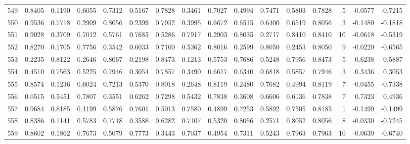 \begin{tabular}{lrrrrrrrrrrrrrrr}
549 &      0.8405 &  0.1190 &  0.6055 &  0.7312 &  0.5167 &  0.7828 &  0.3461 &  0.7027 &  0.4994 &  0.7471 &   0.5803 &     0.7828 &      5 &                   -0.0577 &                    -0.7215 \\
550 &      0.9536 &  0.7718 &  0.2909 &  0.8056 &  0.2399 &  0.7952 &  0.3995 &  0.6672 &  0.6515 &  0.6400 &   0.6519 &     0.8056 &      3 &                   -0.1480 &                    -0.1818 \\
551 &      0.9028 &  0.3709 &  0.7012 &  0.5761 &  0.7685 &  0.5286 &  0.7917 &  0.2903 &  0.8035 &  0.2717 &   0.8410 &     0.8410 &     10 &                   -0.0618 &                    -0.5319 \\
552 &      0.8270 &  0.1705 &  0.7756 &  0.3542 &  0.6033 &  0.7160 &  0.5362 &  0.8016 &  0.2599 &  0.8050 &   0.2453 &     0.8050 &      9 &                   -0.0220 &                    -0.6565 \\
553 &      0.2235 &  0.8122 &  0.2646 &  0.8067 &  0.2198 &  0.8473 &  0.1213 &  0.5753 &  0.7686 &  0.5248 &   0.7956 &     0.8473 &      5 &                    0.6238 &                     0.5887 \\
554 &      0.4510 &  0.7563 &  0.5225 &  0.7946 &  0.3054 &  0.7857 &  0.3490 &  0.6617 &  0.6340 &  0.6818 &   0.5857 &     0.7946 &      3 &                    0.3436 &                     0.3053 \\
555 &      0.8574 &  0.1236 &  0.6024 &  0.7213 &  0.5370 &  0.8018 &  0.2648 &  0.8119 &  0.2480 &  0.7682 &   0.4994 &     0.8119 &      7 &                   -0.0455 &                    -0.7338 \\
556 &      0.0515 &  0.5451 &  0.7807 &  0.3551 &  0.6262 &  0.7298 &  0.5432 &  0.7838 &  0.3608 &  0.6606 &   0.6136 &     0.7838 &      7 &                    0.7323 &                     0.4936 \\
557 &      0.9684 &  0.8185 &  0.1199 &  0.5876 &  0.7601 &  0.5013 &  0.7580 &  0.4899 &  0.7253 &  0.5892 &   0.7505 &     0.8185 &      1 &                   -0.1499 &                    -0.1499 \\
558 &      0.8386 &  0.1141 &  0.5783 &  0.7718 &  0.3588 &  0.6282 &  0.7107 &  0.5320 &  0.8056 &  0.2571 &   0.8052 &     0.8056 &      8 &                   -0.0330 &                    -0.7245 \\
559 &      0.8602 &  0.1862 &  0.7673 &  0.5079 &  0.7773 &  0.3443 &  0.7037 &  0.4954 &  0.7311 &  0.5243 &   0.7963 &     0.7963 &     10 &                   -0.0639 &                    -0.6740 \\

\end{tabular}
